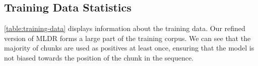 \subsection{Training Data Statistics}\label{app:training_data}

\autoref{table:training-data} displays information about the training data. Our refined version of MLDR forms a large part of the training corpus. We can see that the majority of chunks are used as positives at least once, ensuring that the model is not biased towards the position of the chunk in the sequence.

\begin{table}[ht]
    \centering
    
    \caption[Training dataset statistics]{Training Dataset Statistics} 
    \label{table:training-data}
\end{table}







